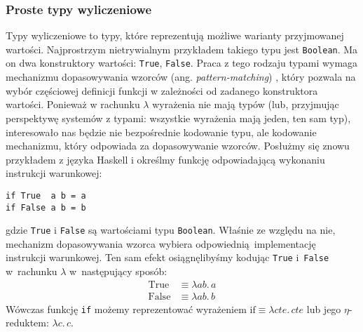 \subsubsection{Proste typy wyliczeniowe}\label{ref:untyped_simple_enumeration}
Typy wyliczeniowe to typy, które reprezentują możliwe warianty przyjmowanej wartości. Najprostrzym nietrywialnym przykładem takiego typu jest \texttt{Boolean}. Ma on dwa konstruktory wartości: \texttt{True}, \texttt{False}. Praca z tego rodzaju typami wymaga mechanizmu dopasowywania wzorców (ang. \emph{pattern-matching}) \cite[Rozdział IV]{PeytonJones:1992:IFL:129390}, który pozwala na wybór częściowej definicji funkcji w zależności od zadanego konstruktora wartości. Ponieważ w rachunku \(\lambda\) wyrażenia nie mają typów (lub, przyjmując perspektywę systemów z typami: wszystkie wyrażenia mają jeden, ten sam typ), interesowało nas będzie nie bezpośrednie kodowanie typu, ale kodowanie mechanizmu, który odpowiada za dopasowywanie wzorców. Posłużmy się znowu przykładem z języka Haskell i określmy funkcję odpowiadającą wykonaniu instrukcji warunkowej:
\begin{verbatim}
if True  a b = a
if False a b = b
\end{verbatim}
gdzie \texttt{True} i \texttt{False} są wartościami typu \texttt{Boolean}. Właśnie ze względu na nie, mechanizm dopasowywania wzorca wybiera odpowiednią im\-ple\-men\-ta\-cję instrukcji warunkowej. Ten sam efekt osiągnęlibyśmy kodując \texttt{True} i~\texttt{False} w~rachunku \(\lambda\) w~następujący sposób:
\begin{align*}
  \mathrm{True} &\equiv \lambda a b.\,a\\
  \mathrm{False} &\equiv \lambda a b.\,b
\end{align*}
Wówczas funkcję \texttt{if} możemy reprezentować wyrażeniem \(\mathrm{if}\equiv\lambda c t e.\, cte\) lub jego \(\eta\)-reduktem: \(\lambda c.\,c\).

